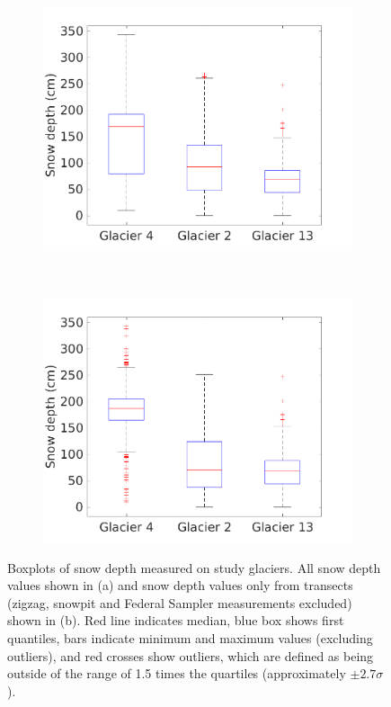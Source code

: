 \documentclass{sfuthesis}
\begin{document}
\begin{figure}[H]
    \centering
    \begin{subfigure}[b]{0.48\textwidth}
        \includegraphics[width=\textwidth]{box_depth_wZZ.png}
        \caption{ }
        \label{fig:box_depth_wZZ}
    \end{subfigure}
    ~
    \begin{subfigure}[b]{0.48\textwidth}
        \includegraphics[width=\textwidth]{box_depth_noZZ.png}
        \caption{}
        \label{fig:box_depth_noZZ}
    \end{subfigure}

    \caption{Boxplots of snow depth measured on study glaciers. All snow depth values shown in (a) and snow depth values only from transects (zigzag, snowpit and Federal Sampler measurements excluded) shown in (b). Red line indicates median, blue box shows first quantiles, bars indicate minimum and maximum values (excluding outliers), and red crosses show outliers, which are defined as being outside of the range of 1.5 times the quartiles (approximately $\pm2.7\sigma$).}
    \label{fig:box_depth_transects}
\end{figure}
\end{document}
